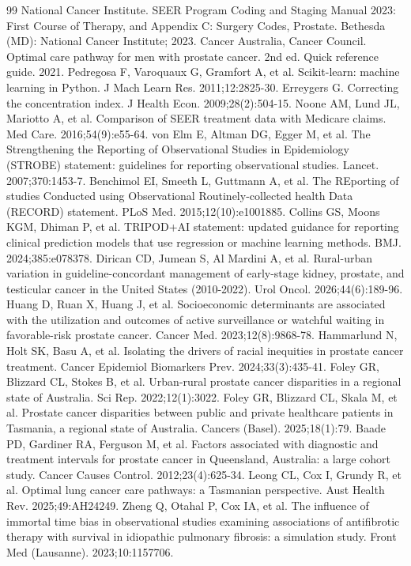 \documentclass[10pt,a4paper,twocolumn]{article}
\begin{document}
\begin{thebibliography}{99}
 National Cancer Institute. SEER Program Coding and Staging Manual 2023: First Course of Therapy, and Appendix C: Surgery Codes, Prostate. Bethesda (MD): National Cancer Institute; 2023.
 Cancer Australia, Cancer Council. Optimal care pathway for men with prostate cancer. 2nd ed. Quick reference guide. 2021.
 Pedregosa F, Varoquaux G, Gramfort A, et al. Scikit-learn: machine learning in Python. J Mach Learn Res. 2011;12:2825-30.
 Erreygers G. Correcting the concentration index. J Health Econ. 2009;28(2):504-15.
 Noone AM, Lund JL, Mariotto A, et al. Comparison of SEER treatment data with Medicare claims. Med Care. 2016;54(9):e55-64.
 von Elm E, Altman DG, Egger M, et al. The Strengthening the Reporting of Observational Studies in Epidemiology (STROBE) statement: guidelines for reporting observational studies. Lancet. 2007;370:1453-7.
 Benchimol EI, Smeeth L, Guttmann A, et al. The REporting of studies Conducted using Observational Routinely-collected health Data (RECORD) statement. PLoS Med. 2015;12(10):e1001885.
 Collins GS, Moons KGM, Dhiman P, et al. TRIPOD+AI statement: updated guidance for reporting clinical prediction models that use regression or machine learning methods. BMJ. 2024;385:e078378.
 Dirican CD, Jumean S, Al Mardini A, et al. Rural-urban variation in guideline-concordant management of early-stage kidney, prostate, and testicular cancer in the United States (2010-2022). Urol Oncol. 2026;44(6):189-96.
 Huang D, Ruan X, Huang J, et al. Socioeconomic determinants are associated with the utilization and outcomes of active surveillance or watchful waiting in favorable-risk prostate cancer. Cancer Med. 2023;12(8):9868-78.
 Hammarlund N, Holt SK, Basu A, et al. Isolating the drivers of racial inequities in prostate cancer treatment. Cancer Epidemiol Biomarkers Prev. 2024;33(3):435-41.
 Foley GR, Blizzard CL, Stokes B, et al. Urban-rural prostate cancer disparities in a regional state of Australia. Sci Rep. 2022;12(1):3022.
 Foley GR, Blizzard CL, Skala M, et al. Prostate cancer disparities between public and private healthcare patients in Tasmania, a regional state of Australia. Cancers (Basel). 2025;18(1):79.
 Baade PD, Gardiner RA, Ferguson M, et al. Factors associated with diagnostic and treatment intervals for prostate cancer in Queensland, Australia: a large cohort study. Cancer Causes Control. 2012;23(4):625-34.
 Leong CL, Cox I, Grundy R, et al. Optimal lung cancer care pathways: a Tasmanian perspective. Aust Health Rev. 2025;49:AH24249.
 Zheng Q, Otahal P, Cox IA, et al. The influence of immortal time bias in observational studies examining associations of antifibrotic therapy with survival in idiopathic pulmonary fibrosis: a simulation study. Front Med (Lausanne). 2023;10:1157706.
\end{thebibliography}
\end{document}
